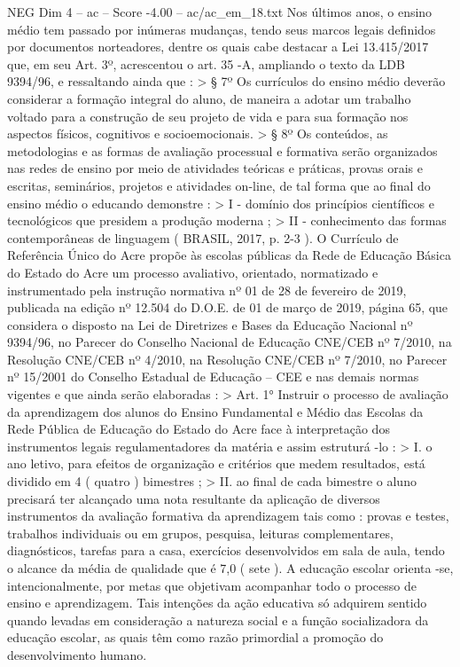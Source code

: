 \begin{textsample}{NEG Dim 4 – ac – Score -4.00 – ac/ac\_em\_18.txt}
Nos últimos anos, o ensino médio tem passado por inúmeras mudanças, tendo seus marcos legais definidos por documentos norteadores, dentre os quais cabe destacar a Lei 13.415/2017 que, em seu Art. 3º, acrescentou o art. 35 -A, ampliando o texto da LDB 9394/96, e ressaltando ainda que : > § 7º Os currículos do ensino médio deverão considerar a formação integral do aluno, de maneira a adotar um trabalho voltado para a construção de seu projeto de vida e para sua formação nos aspectos físicos, cognitivos e socioemocionais. > § 8º Os conteúdos, as metodologias e as formas de avaliação processual e formativa serão organizados nas redes de ensino por meio de atividades teóricas e práticas, provas orais e escritas, seminários, projetos e atividades on-line, de tal forma que ao final do ensino médio o educando demonstre : > I - domínio dos princípios científicos e tecnológicos que presidem a produção moderna ; > II - conhecimento das formas contemporâneas de linguagem ( BRASIL, 2017, p. 2-3 ).
O Currículo de Referência Único do Acre propõe às escolas públicas da Rede de Educação Básica do Estado do Acre um processo avaliativo, orientado, normatizado e instrumentado pela instrução normativa nº 01 de 28 de fevereiro de 2019, publicada na edição nº 12.504 do D.O.E. de 01 de março de 2019, página 65, que considera o disposto na Lei de Diretrizes e Bases da Educação Nacional nº 9394/96, no Parecer do Conselho Nacional de Educação CNE/CEB nº 7/2010, na Resolução CNE/CEB nº 4/2010, na Resolução CNE/CEB nº 7/2010, no Parecer nº 15/2001 do Conselho Estadual de Educação – CEE e nas demais normas vigentes e que ainda serão elaboradas : > Art. 1{\EmojiFont °} Instruir o processo de avaliação da aprendizagem dos alunos do Ensino Fundamental e Médio das Escolas da Rede Pública de Educação do Estado do Acre face à interpretação dos instrumentos legais regulamentadores da matéria e assim estruturá -lo : > I. o ano letivo, para efeitos de organização e critérios que medem resultados, está dividido em 4 ( quatro ) bimestres ; > II. ao final de cada bimestre o aluno precisará ter alcançado uma nota resultante da aplicação de diversos instrumentos da avaliação formativa da aprendizagem tais como : provas e testes, trabalhos individuais ou em grupos, pesquisa, leituras complementares, diagnósticos, tarefas para a casa, exercícios desenvolvidos em sala de aula, tendo o alcance da média de qualidade que é 7,0 ( sete ).
A educação escolar orienta -se, intencionalmente, por metas que objetivam acompanhar todo o processo de ensino e aprendizagem.
Tais intenções da ação educativa só adquirem sentido quando levadas em consideração a natureza social e a função socializadora da educação escolar, as quais têm como razão primordial a promoção do desenvolvimento humano.

\end{textsample}

